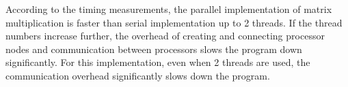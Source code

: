 \documentclass{article}
\begin{document}
\null\qquad According to the timing measurements, the parallel implementation of matrix multiplication is faster than serial implementation up to 2 threads. If the thread numbers increase further, the overhead of creating and connecting processor nodes and communication between processors slows the program down significantly. For this implementation, even when 2 threads are used, the communication overhead significantly slows down the program. \\
\end{document}
